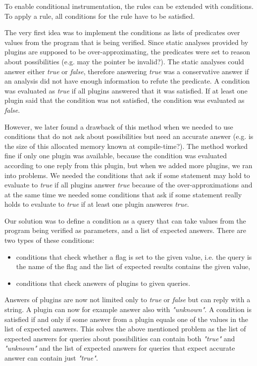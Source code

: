 To enable conditional instrumentation, the rules can be extended with
conditions. To apply a rule, all conditions for the rule have to be satisfied.

The very first idea was to implement the conditions as lists of predicates over
values from the program that is being verified. Since static analyses provided
by plugins are supposed to be over-approximating, the predicates were set to
reason about possibilities (e.g. may the pointer be invalid?). The static
analyses could answer either \emph{true} or \emph{false}, therefore answering
\emph{true} was a conservative answer if an analysis did not have enough
information to refute the predicate. A condition was evaluated as \emph{true}
if all plugins answered that it was satisfied. If at least one plugin said that
the condition was not satisfied, the condition was evaluated as \emph{false}.

However, we later found a drawback of this method when we needed to use
conditions that do not ask about possibilities but need an accurate answer
(e.g. is the size of this allocated memory known at compile-time?). The method
worked fine if only one plugin was available, because the condition was
evaluated according to one reply from this plugin, but when we added more
plugins, we ran into problems. We needed the conditions that ask if some
statement may hold to evaluate to \emph{true} if all plugins answer
\emph{true} because of the over-approximations and at the same time we needed
some conditions that ask if some statement really holds to evaluate to
\emph{true} if at least one plugin answeres \emph{true}.

Our solution was to define a condition as a query that can take values from the
program being verified as parameters, and a list of expected answers. There are
two types of these conditions:
\begin{itemize}
 \item conditions that check whether a flag is set to the given value, i.e. the
 query is the name of the flag and the list of expected results contains the
 given value,
 \item conditions that check answers of plugins to given queries.
\end{itemize}
Answers of plugins are now not limited only to \emph{true} or \emph{false} but
can reply with a string. A plugin can now for example answer also with
\emph{"unknown"}. A condition is satisfied if and only if some answer from a
plugin equals one of the values in the list of expected answers. This solves
the above mentioned problem as the list of expected answers for queries about
possibilities can contain both \emph{"true"} and \emph{"unknown"} and the list
of expected answers for queries that expect accurate answer can contain just
\emph{"true"}.


